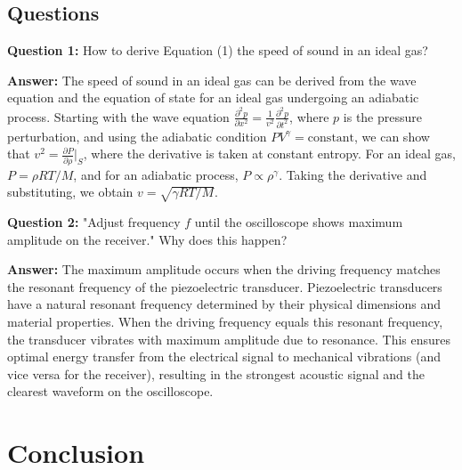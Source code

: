 \documentclass[12pt]{article}
\begin{document}
\subsection{Questions}

\textbf{Question 1:} How to derive Equation (1) the speed of sound in an ideal gas?

\textbf{Answer:} The speed of sound in an ideal gas can be derived from the wave equation and the equation of state for an ideal gas undergoing an adiabatic process. Starting with the wave equation $\frac{\partial^2 p}{\partial x^2} = \frac{1}{v^2}\frac{\partial^2 p}{\partial t^2}$, where $p$ is the pressure perturbation, and using the adiabatic condition $PV^\gamma = \text{constant}$, we can show that $v^2 = \frac{\partial P}{\partial \rho}|_S$, where the derivative is taken at constant entropy. For an ideal gas, $P = \rho RT/M$, and for an adiabatic process, $P \propto \rho^\gamma$. Taking the derivative and substituting, we obtain $v = \sqrt{\gamma RT/M}$.

\textbf{Question 2:} "Adjust frequency $f$ until the oscilloscope shows maximum amplitude on the receiver." Why does this happen?

\textbf{Answer:} The maximum amplitude occurs when the driving frequency matches the resonant frequency of the piezoelectric transducer. Piezoelectric transducers have a natural resonant frequency determined by their physical dimensions and material properties. When the driving frequency equals this resonant frequency, the transducer vibrates with maximum amplitude due to resonance. This ensures optimal energy transfer from the electrical signal to mechanical vibrations (and vice versa for the receiver), resulting in the strongest acoustic signal and the clearest waveform on the oscilloscope.

\section{Conclusion}
\end{document}
